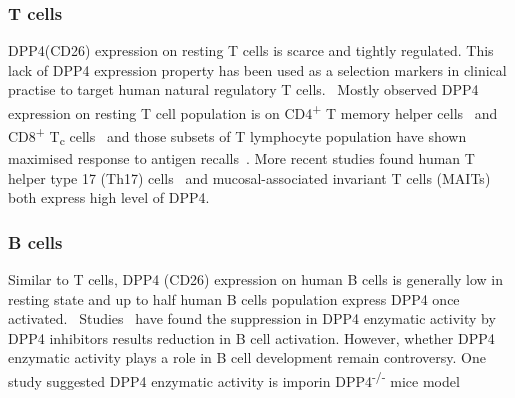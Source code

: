 \subsubsection{T cells}
DPP4(CD26) expression on resting T cells is scarce and tightly regulated. This lack of DPP4 expression property has been used as a selection markers in clinical practise to target human natural regulatory T cells.~\cite{Salgado2012,Garcia2014} Mostly observed DPP4 expression on resting T cell population is on CD4\textsuperscript{+} T memory helper cells~\cite{Gorrell1991, Morimoto1998} and CD8\textsuperscript{+} T\textsubscript{c} cells~\cite{Waumans2015,Hatano2013} and those subsets of T lymphocyte population have shown maximised response to antigen recalls~\cite{Waumans2015,Morimoto1998,Hatano2013}. More recent studies found human T helper type 17 (Th17) cells~\cite{Bengsch2012} and mucosal-associated invariant T cells (MAITs)~\cite{Sharma2015} both express high level of DPP4.

\subsubsection{B cells}
Similar to T cells, DPP4 (CD26) expression on human B cells is generally low in resting state and up to half human B cells population express DPP4 once activated.~\cite{B_hling_1995} Studies~\cite{B_hling_1995,Micouin1997} have found the suppression in DPP4 enzymatic activity by DPP4 inhibitors results reduction in B cell activation. However, whether DPP4 enzymatic activity plays a role in B cell development remain controversy. One study suggested DPP4 enzymatic activity is imporin DPP4\textsuperscript{-/-} mice model 